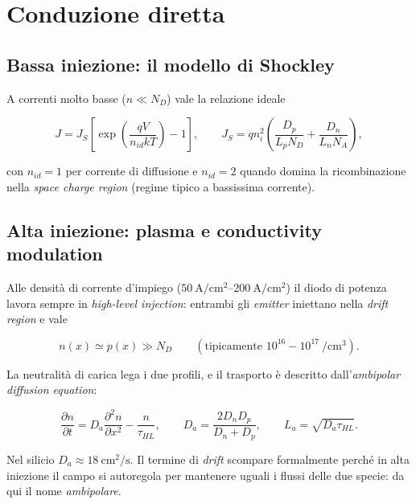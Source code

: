 \section{Conduzione diretta}

\subsection{Bassa iniezione: il modello di Shockley}

A correnti molto basse ($n \ll N_D$) vale la relazione ideale

\begin{equation}
J = J_S \left[ \exp\!\left(\frac{qV}{n_{id} kT}\right) - 1 \right],
\qquad
J_S = q n_i^{2}\left(\frac{D_p}{L_p N_D} + \frac{D_n}{L_n N_A}\right),
\end{equation}

con $n_{id}=1$ per corrente di diffusione e $n_{id}=2$ quando domina la
ricombinazione nella \emph{space charge region} (regime tipico a bassissima
corrente).

\subsection{Alta iniezione: plasma e conductivity modulation}

Alle densità di corrente d'impiego ($\SIrange{50}{200}{\ampere\per\centi\meter\squared}$)
il diodo di potenza lavora sempre in \emph{high-level injection}: entrambi gli
\emph{emitter} iniettano nella \emph{drift region} e vale

\begin{equation}
n(x) \simeq p(x) \gg N_D \qquad (\text{tipicamente } 10^{16}\!-\!10^{17}\ \si{\per\centi\meter\cubed}).
\end{equation}

La neutralità di carica lega i due profili, e il trasporto è descritto
dall'\emph{ambipolar diffusion equation}:

\begin{equation}
\frac{\partial n}{\partial t}
= D_a \frac{\partial^{2} n}{\partial x^{2}} - \frac{n}{\tau_{HL}},
\qquad
D_a = \frac{2 D_n D_p}{D_n + D_p},
\qquad
L_a = \sqrt{D_a \tau_{HL}} .
\end{equation}

Nel silicio $D_a \approx \SI{18}{\centi\meter\squared\per\second}$. Il termine
di \emph{drift} scompare formalmente perché in alta iniezione il campo si
autoregola per mantenere uguali i flussi delle due specie: da qui il nome
\emph{ambipolare}.

